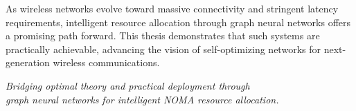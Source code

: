As wireless networks evolve toward massive connectivity and stringent latency requirements, intelligent resource allocation through graph neural networks offers a promising path forward. This thesis demonstrates that such systems are practically achievable, advancing the vision of self-optimizing networks for next-generation wireless communications.

\vspace{0.5cm}
\begin{center}
\textit{Bridging optimal theory and practical deployment through}\\
\textit{graph neural networks for intelligent NOMA resource allocation.}
\end{center}
